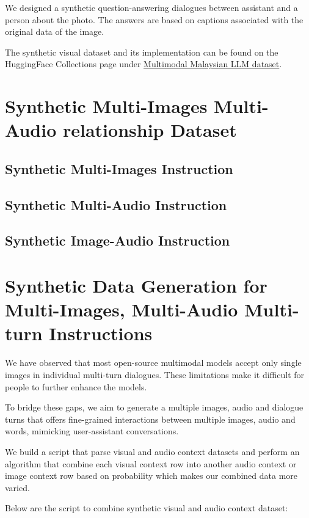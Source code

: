 \documentclass[preprint]{article}
\begin{document}
We designed a synthetic question-answering dialogues between assistant and a person about the photo. The answers are based on captions associated with the original data of the image.

The synthetic visual dataset and its implementation can be found on the HuggingFace Collections page under \href{https://huggingface.co/collections/mesolitica/multimodal-malaysian-llm-dataset-653a16214037a1bc4417eb3a}{Multimodal Malaysian LLM dataset}.

\section{Synthetic Multi-Images Multi-Audio relationship Dataset}

\subsection{Synthetic Multi-Images Instruction}

\subsection{Synthetic Multi-Audio Instruction}

\subsection{Synthetic Image-Audio Instruction}

\section{Synthetic Data Generation for Multi-Images, Multi-Audio Multi-turn Instructions}
We have observed that most open-source multimodal models accept only single images in individual multi-turn dialogues. These limitations make it difficult for people to further enhance the models.

To bridge these gaps, we aim to generate a multiple images, audio and dialogue turns that offers fine-grained interactions between multiple images, audio and words, mimicking user-assistant conversations.

We build a script that parse visual and audio context datasets and perform an algorithm that combine each visual context row into another audio context or image context row based on probability which makes our combined data more varied.

Below are the script to combine synthetic visual and audio context dataset: 
\end{document}
